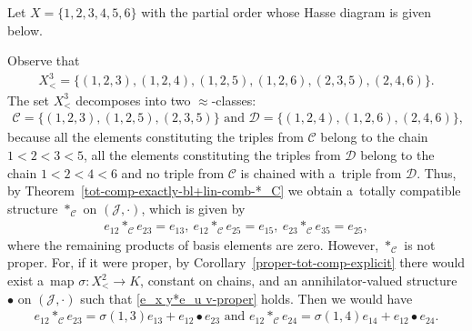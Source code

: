 \documentclass{jonasart}
\newcommand{\bl}{\bullet}
\newcommand{\C}{\mathcal{C}}
\newcommand{\D}{\mathcal{D}}
\newcommand{\J}{\mathcal{J}}
\newcommand{\sg}{\sigma}
\begin{document}
	\begin{example}\label{Y-poset-non-proper}
		Let $X=\{1,2,3,4,5,6\}$ with the partial order whose Hasse diagram is given below.
		\begin{center}
		\end{center}
		Observe that
		\begin{align*}
			X^3_< =\{(1,2,3),(1,2,4),(1,2,5),(1,2,6),(2,3,5),(2,4,6)\}.
		\end{align*}
		The set $X^3_<$ decomposes into two $\approx$-classes:
		\begin{align*}
			\C=\{(1,2,3),(1,2,5),(2,3,5)\}\text{ and }\D=\{(1,2,4),(1,2,6),(2,4,6)\},
		\end{align*}
		because all the elements constituting the triples from $\C$ belong to the chain $1<2<3<5$, all the elements constituting the triples from $\D$ belong to the chain $1<2<4<6$ and no triple from $\C$ is chained with a~triple from $\D$. Thus, by Theorem~\ref{tot-comp-exactly-bl+lin-comb-*_C} we obtain a~totally compatible structure $*_\C$ on $(\J,\cdot)$, which is given by
		\begin{align}\label{e_1 2*_C e_2 3=e_1 3}
			e_{12}*_\C e_{23}=e_{13},\ e_{12}*_\C e_{25}=e_{15},\ e_{23}*_\C e_{35}=e_{25},
		\end{align}
		where the remaining products of basis elements are zero. However, $*_\C$ is not proper. For, if it were proper, by Corollary~\ref{proper-tot-comp-explicit} there would exist a~map $\sg:X^2_<\to K$, constant on chains, and an annihilator-valued structure $\bl$ on $(\J,\cdot)$ such that \eqref{e_x y*e_u v-proper} holds. Then we would have
		\begin{align}\label{e_1 2*_C e_2 3-and-e_1 2*_C e_2 4}
			e_{12}*_\C e_{23}=\sg(1,3)e_{13}+e_{12}\bl e_{23}\text{ and }e_{12}*_\C e_{24}=\sg(1,4)e_{14}+e_{12}\bl e_{24}.

\end{align}
\end{example}
\end{document}

